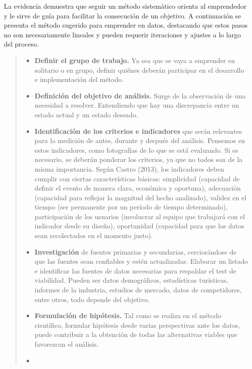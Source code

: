 \documentclass[
  letterpaper,
  DIV=11,
  numbers=noendperiod]{scrreprt}
\providecommand{\tightlist}{%
  \setlength{\itemsep}{0pt}\setlength{\parskip}{0pt}}\usepackage{longtable,booktabs,array}
\begin{document}
La evidencia demuestra que seguir un método sistemático orienta al
emprendedor y le sirve de guía para facilitar la consecución de un
objetivo. A continuación se presenta el método sugerido para emprender
en datos, destacando que estos pasos no son necesariamente lineales y
pueden requerir iteraciones y ajustes a lo largo del proceso.

\begin{quote}
\begin{itemize}
\tightlist
\item
  \textbf{Definir el grupo de trabajo.} Ya sea que se vaya a emprender
  en solitario o en grupo, definir quiénes deberán participar en el
  desarrollo e implementación del método.
\item
  \textbf{Definición del objetivo de análisis.} Surge de la observación
  de una necesidad a resolver. Entendiendo que hay una discrepancia
  entre un estado actual y un estado deseado.
\item
  \textbf{Identificación de los criterios e indicadores} que serán
  relevantes para la medición de antes, durante y después del análisis.
  Pensemos en estos indicadores, como fotografías de lo que se está
  evaluando. Si es necesario, se deberán ponderar los criterios, ya que
  no todos son de la misma importancia. Según Castro (2013), los
  indicadores deben cumplir con ciertas características básicas:
  simplicidad (capacidad de definir el evento de manera clara, económica
  y oportuna), adecuación (capacidad para reflejar la magnitud del hecho
  analizado), validez en el tiempo (ser permanente por un período de
  tiempo determinado), participación de los usuarios (involucrar al
  equipo que trabajará con el indicador desde su diseño), oportunidad
  (capacidad para que los datos sean recolectados en el momento justo).
\item
  \textbf{Investigación} de fuentes primarias y secundarias,
  cerciorándose de que las fuentes sean confiables y estén actualizadas.
  Elaborar un listado e identificar las fuentes de datos necesarias para
  respaldar el test de viabilidad. Pueden ser datos demográficos,
  estadísticas turísticas, informes de la industria, estudios de
  mercado, datos de competidores, entre otros, todo depende del
  objetivo.
\item
  \textbf{Formulación de hipótesis.} Tal como se realiza en el método
  científico, formular hipótesis desde varias perspectivas ante los
  datos, puede contribuir a la obtención de todas las alternativas
  viables que favorezcan el análisis.
\item

\end{itemize}
\end{quote}
\end{document}
